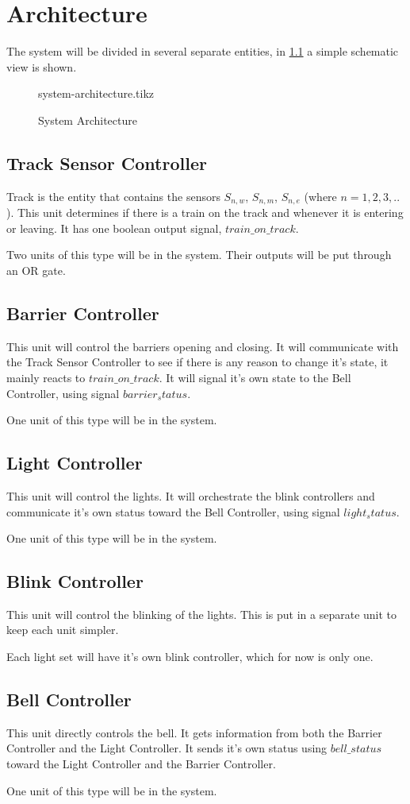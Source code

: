 \documentclass[final]{report}
\begin{document}
\chapter{Architecture}
The system will be divided in several separate entities, in \cref{fig:system-architecture} a simple schematic view is shown.

\begin{figure}[H]
	\centering
	{system-architecture.tikz}
	\caption{System Architecture}
	\label{fig:system-architecture}
\end{figure}

\section{Track Sensor Controller}
Track is the entity that contains the sensors $S_{n,w}$, $S_{n,m}$, $S_{n,e}$ (where $n = 1,2,3,..$).
This unit determines if there is a train on the track and whenever it is entering or leaving.
It has one boolean output signal, $train\_on\_track$.

Two units of this type will be in the system.
Their outputs will be put through an OR gate.
\section{Barrier Controller}
This unit will control the barriers opening and closing.
It will communicate with the Track Sensor Controller to see if there is any reason to change it's state, it mainly reacts to $train\_on\_track$.
It will signal it's own state to the Bell Controller, using signal $barrier_status$.

One unit of this type will be in the system.
\section{Light Controller}
This unit will control the lights.
It will orchestrate the blink controllers and communicate it's own status toward the Bell Controller, using signal $light_status$.

One unit of this type will be in the system.
\section{Blink Controller}
This unit will control the blinking of the lights.
This is put in a separate unit to keep each unit simpler.

Each light set will have it's own blink controller, which for now is only one.
\section{Bell Controller}
This unit directly controls the bell.
It gets information from both the Barrier Controller and the Light Controller.
It sends it's own status using $bell\_status$ toward the Light Controller and the Barrier Controller.

One unit of this type will be in the system.
\end{document}

